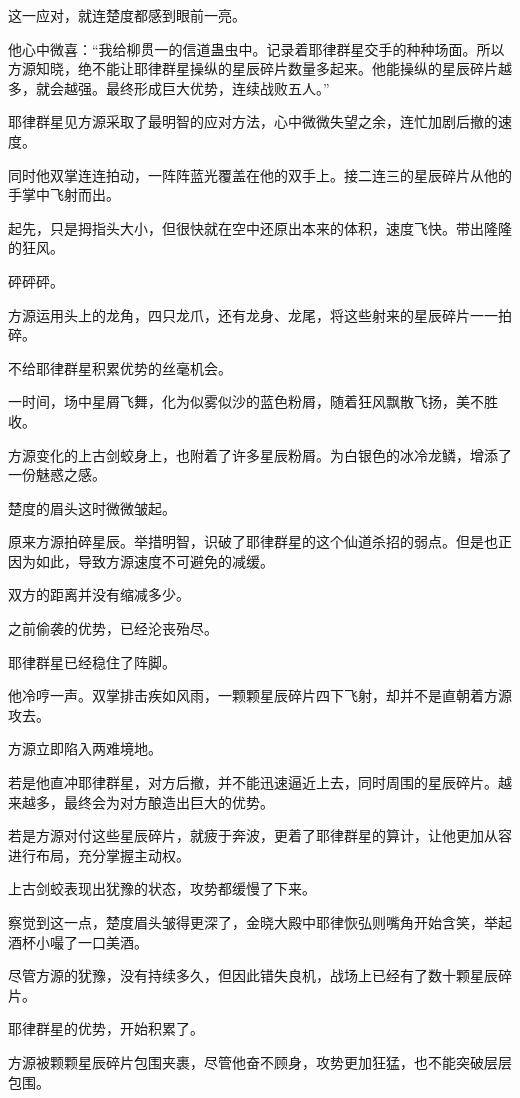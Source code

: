 \begin{this_body}
这一应对，就连楚度都感到眼前一亮。

他心中微喜：“我给柳贯一的信道蛊虫中。记录着耶律群星交手的种种场面。所以方源知晓，绝不能让耶律群星操纵的星辰碎片数量多起来。他能操纵的星辰碎片越多，就会越强。最终形成巨大优势，连续战败五人。”

耶律群星见方源采取了最明智的应对方法，心中微微失望之余，连忙加剧后撤的速度。

同时他双掌连连拍动，一阵阵蓝光覆盖在他的双手上。接二连三的星辰碎片从他的手掌中飞射而出。

起先，只是拇指头大小，但很快就在空中还原出本来的体积，速度飞快。带出隆隆的狂风。

砰砰砰。

方源运用头上的龙角，四只龙爪，还有龙身、龙尾，将这些射来的星辰碎片一一拍碎。

不给耶律群星积累优势的丝毫机会。

一时间，场中星屑飞舞，化为似雾似沙的蓝色粉屑，随着狂风飘散飞扬，美不胜收。

方源变化的上古剑蛟身上，也附着了许多星辰粉屑。为白银色的冰冷龙鳞，增添了一份魅惑之感。

楚度的眉头这时微微皱起。

原来方源拍碎星辰。举措明智，识破了耶律群星的这个仙道杀招的弱点。但是也正因为如此，导致方源速度不可避免的减缓。

双方的距离并没有缩减多少。

之前偷袭的优势，已经沦丧殆尽。

耶律群星已经稳住了阵脚。

他冷哼一声。双掌排击疾如风雨，一颗颗星辰碎片四下飞射，却并不是直朝着方源攻去。

方源立即陷入两难境地。

若是他直冲耶律群星，对方后撤，并不能迅速逼近上去，同时周围的星辰碎片。越来越多，最终会为对方酿造出巨大的优势。

若是方源对付这些星辰碎片，就疲于奔波，更着了耶律群星的算计，让他更加从容进行布局，充分掌握主动权。

上古剑蛟表现出犹豫的状态，攻势都缓慢了下来。

察觉到这一点，楚度眉头皱得更深了，金晓大殿中耶律恢弘则嘴角开始含笑，举起酒杯小嘬了一口美酒。

尽管方源的犹豫，没有持续多久，但因此错失良机，战场上已经有了数十颗星辰碎片。

耶律群星的优势，开始积累了。

方源被颗颗星辰碎片包围夹裹，尽管他奋不顾身，攻势更加狂猛，也不能突破层层包围。


\end{this_body}
